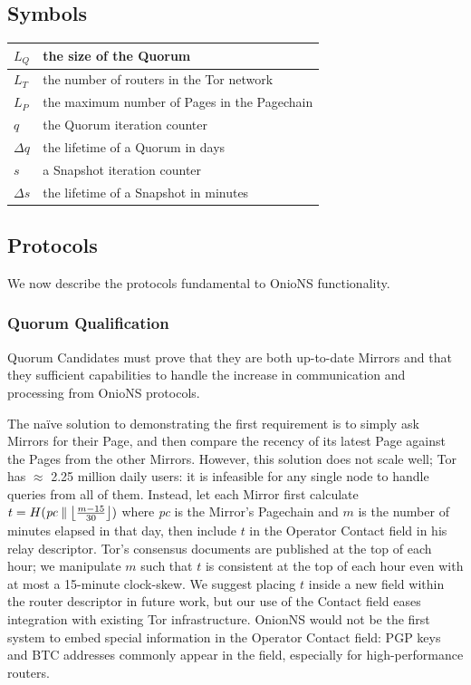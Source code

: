 \documentclass{sig-alternate}
\DeclarePairedDelimiter{\floor}{\lfloor}{\rfloor}
\newcommand*\concat{\mathbin{\|}}
\begin{document}
\subsection{Symbols}

\begin{center}
  \begin{tabular}{ | l | l } \hline
    $ L_{Q} $ & the size of the Quorum \\ \hline
    $ L_{T} $ & the number of routers in the Tor network \\ \hline
    $ L_{P} $ & the maximum number of Pages in the Pagechain \\ \hline
    $ q $ & the Quorum iteration counter \\ \hline
    $ \Delta q $ & the lifetime of a Quorum in days \\ \hline
    $ s $ & a Snapshot iteration counter \\ \hline
    $ \Delta s $ & the lifetime of a Snapshot in minutes \\ \hline
  \end{tabular}
\end{center}

\subsection{Protocols}

We now describe the protocols fundamental to OnioNS functionality.

\subsubsection{Quorum Qualification}

Quorum Candidates must prove that they are both up-to-date Mirrors and that they sufficient capabilities to handle the increase in communication and processing from OnioNS protocols.

The na\"{i}ve solution to demonstrating the first requirement is to simply ask Mirrors for their Page, and then compare the recency of its latest Page against the Pages from the other Mirrors. However, this solution does not scale well; Tor has $ \approx $ 2.25 million daily users\cite{TorMetrics}: it is infeasible for any single node to handle queries from all of them. Instead, let each Mirror first calculate $ t = H(\mathit{pc} \concat \floor[\big]{\frac{m - 15}{30}}) $ where \emph{pc} is the Mirror's Pagechain and $ m $ is the number of minutes elapsed in that day, then include $ t $ in the Operator Contact field in his relay descriptor. Tor's consensus documents are published at the top of each hour; we manipulate $ m $ such that $ t $ is consistent at the top of each hour even with at most a 15-minute clock-skew. We suggest placing $ t $ inside a new field within the router descriptor in future work, but our use of the Contact field eases integration with existing Tor infrastructure. OnionNS would not be the first system to embed special information in the Operator Contact field: PGP keys and BTC addresses commonly appear in the field, especially for high-performance routers.
\end{document}
